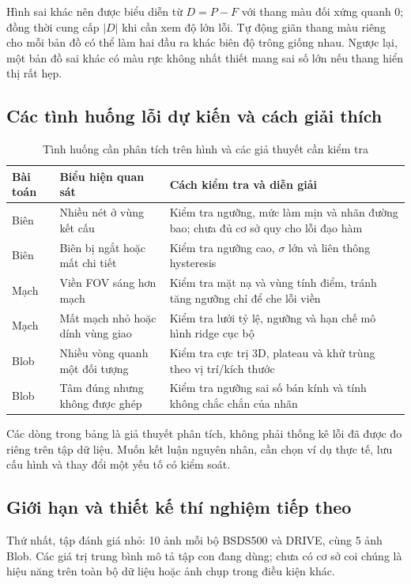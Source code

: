 Hình sai khác nên được biểu diễn từ $D=P-F$ với thang màu đối xứng quanh 0; đồng thời cung cấp $|D|$ khi cần xem độ lớn lỗi. Tự động giãn thang màu riêng cho mỗi bản đồ có thể làm hai đầu ra khác biên độ trông giống nhau. Ngược lại, một bản đồ sai khác có màu rực không nhất thiết mang sai số lớn nếu thang hiển thị rất hẹp.

\subsection{Các tình huống lỗi dự kiến và cách giải thích}
\begin{table}[t]
\centering
\caption{Tình huống cần phân tích trên hình và các giả thuyết cần kiểm tra}
\begin{tabularx}{\textwidth}{lXX}
\toprule
Bài toán & Biểu hiện quan sát & Cách kiểm tra và diễn giải\\
\midrule
Biên & Nhiều nét ở vùng kết cấu & Kiểm tra ngưỡng, mức làm mịn và nhãn đường bao; chưa đủ cơ sở quy cho lỗi đạo hàm\\
Biên & Biên bị ngắt hoặc mất chi tiết & Kiểm tra ngưỡng cao, $\sigma$ lớn và liên thông hysteresis\\
Mạch & Viền FOV sáng hơn mạch & Kiểm tra mặt nạ và vùng tính điểm, tránh tăng ngưỡng chỉ để che lỗi viền\\
Mạch & Mất mạch nhỏ hoặc dính vùng giao & Kiểm tra lưới tỷ lệ, ngưỡng và hạn chế mô hình ridge cục bộ\\
Blob & Nhiều vòng quanh một đối tượng & Kiểm tra cực trị 3D, plateau và khử trùng theo vị trí/kích thước\\
Blob & Tâm đúng nhưng không được ghép & Kiểm tra ngưỡng sai số bán kính và tính không chắc chắn của nhãn\\
\bottomrule
\end{tabularx}
\end{table}
Các dòng trong bảng là giả thuyết phân tích, không phải thống kê lỗi đã được đo riêng trên tập dữ liệu. Muốn kết luận nguyên nhân, cần chọn ví dụ thực tế, lưu cấu hình và thay đổi một yếu tố có kiểm soát.

\subsection{Giới hạn và thiết kế thí nghiệm tiếp theo}
Thứ nhất, tập đánh giá nhỏ: 10 ảnh mỗi bộ BSDS500 và DRIVE, cùng 5 ảnh Blob. Các giá trị trung bình mô tả tập con đang dùng; chưa có cơ sở coi chúng là hiệu năng trên toàn bộ dữ liệu hoặc ảnh chụp trong điều kiện khác.


